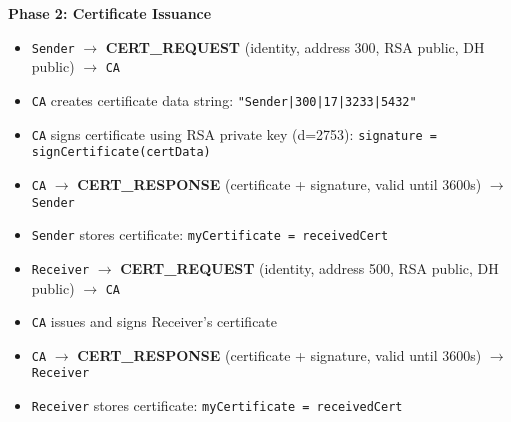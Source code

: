 \documentclass[a4paper,12pt]{extarticle}
\begin{document}
\vspace{0.3cm}
\textbf{Phase 2: Certificate Issuance}
\begin{itemize}[leftmargin=1cm]
    \item \texttt{Sender} $\rightarrow$ \textcolor{maincolor}{\textbf{CERT\_REQUEST}} (identity, address 300, RSA public, DH public) $\rightarrow$ \texttt{CA}
    \item \texttt{CA} creates certificate data string: \texttt{"Sender|300|17|3233|5432"}
    \item \texttt{CA} signs certificate using RSA private key (d=2753): \texttt{signature = signCertificate(certData)}
    \item \texttt{CA} $\rightarrow$ \textcolor{sectioncolor}{\textbf{CERT\_RESPONSE}} (certificate + signature, valid until 3600s) $\rightarrow$ \texttt{Sender}
    \item \texttt{Sender} stores certificate: \texttt{myCertificate = receivedCert}
    \item \texttt{Receiver} $\rightarrow$ \textcolor{maincolor}{\textbf{CERT\_REQUEST}} (identity, address 500, RSA public, DH public) $\rightarrow$ \texttt{CA}
    \item \texttt{CA} issues and signs Receiver's certificate
    \item \texttt{CA} $\rightarrow$ \textcolor{sectioncolor}{\textbf{CERT\_RESPONSE}} (certificate + signature, valid until 3600s) $\rightarrow$ \texttt{Receiver}
    \item \texttt{Receiver} stores certificate: \texttt{myCertificate = receivedCert}
\end{itemize}
\end{document}
